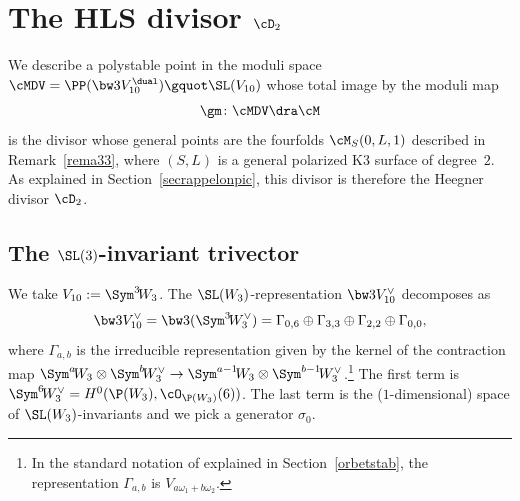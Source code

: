\section{The HLS divisor \texorpdfstring{$\cD_2$}{D2}}\label{div2}

We describe a polystable point in the moduli space
$\cMDV=\PP(\bw3 V_{10}^\dual) \gquot \SL(V_{10})$ whose total image by the moduli map
\[
\gm\colon \cMDV\dra \cM
\]
is the divisor whose general points are the fourfolds $\cM_S(0,L,1)$ described in Remark~\ref{rema33}, where $(S,L)$ is a general polarized K3 surface of degree~$2$. As explained in Section~\ref{secrappelonpic}, this divisor
is therefore the Heegner divisor $\cD_2$.

\subsection{The $\SL(3)$-invariant trivector}\label{trivela}

We take $V_{10}:=\Sym^3 \!W_3$. The $\SL(W_3)$-rep\-resentation
$\bw3V_{10}^\vee$ decomposes as
\begin{equation}\label{deco}
\bw3V_{10}^\vee=\bw3(\Sym^3 \!W_3^{\vee}) = \Gamma_{0,6}\oplus \Gamma_{3,3}\oplus \Gamma_{2,2}\oplus \Gamma_{0,0},
\end{equation}
where $\Gamma_{a,b}$ is the irreducible representation given by the kernel of the contraction map $\Sym^a\! W_3\otimes \Sym^b\! W_3^{\vee}\to \Sym^{a-1}\! W_3\otimes \Sym^{b-1} \!W_3^{\vee}$.\footnote{In the standard notation of \cite{bbki} explained in Section~\ref{orbetstab}, the representation $ \Gamma_{a,b}$ is $ V_{a\omega_1+b\omega_2}$.} The first term is $\Sym^6\!W_3 ^\vee=H^0(\P(W_3),\cO_{\P(W_3)}(6))$. The last term is the ($1$-dimensional) space of $\SL(W_3)$-invariants and we pick a generator $\sigma_0$.

